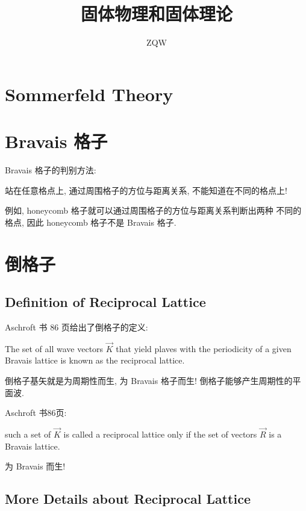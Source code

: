 \documentclass{ctexart}
\title{固体物理和固体理论}
\author{ZQW}
\begin{document}
\maketitle


\section{Sommerfeld Theory}








\section{Bravais 格子}

Bravais 格子的判别方法:

站在任意格点上, 通过周围格子的方位与距离关系, 不能知道在不同的格点上!

例如, honeycomb 格子就可以通过周围格子的方位与距离关系判断出两种
不同的格点, 因此 honeycomb 格子不是 Bravais 格子.

\section{倒格子}

\subsection{Definition of Reciprocal Lattice}

Aschroft 书 86 页给出了倒格子的定义:

The set of all wave vectors $\vec{K}$ that yield plaves with the
periodicity of a given Bravais lattice is known as the reciprocal
lattice.

倒格子基矢就是为周期性而生, 为 Bravais 格子而生! 倒格子能够产生周期性的平面波.

Aschroft 书86页:

such a set of $\vec{K}$ is called a reciprocal lattice only if
the set of vectors $\vec{R}$ is a Bravais lattice.

为 Bravais 而生!

\subsection{More Details about Reciprocal Lattice}
\end{document}
